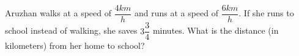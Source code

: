 Aruzhan walks at a speed of $\dfrac{4 k m}{h}$ and runs at a speed of $\dfrac{6 k m}{h}$. If she runs to school instead of walking, she saves $3\dfrac{3}{4}$ minutes. What is the distance (in kilometers) from her home to school?
